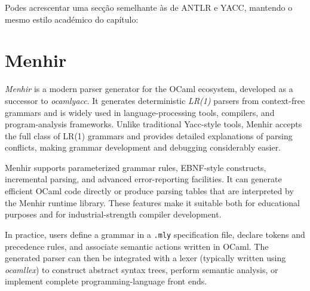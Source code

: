 Podes acrescentar uma secção semelhante às de ANTLR e YACC, mantendo o mesmo estilo académico do capítulo:

\section{Menhir}

\textit{Menhir} is a modern parser generator for the OCaml ecosystem, developed as a successor to \textit{ocamlyacc}. 
It generates deterministic \emph{LR(1)} parsers from context-free grammars and is widely used in language-processing tools,
 compilers, and program-analysis frameworks. Unlike traditional Yacc-style tools, Menhir accepts the full class of LR(1) 
 grammars and provides detailed explanations of parsing conflicts, making grammar development and debugging considerably easier. \cite{menhir}

Menhir supports parameterized grammar rules, EBNF-style constructs, incremental parsing, and advanced error-reporting facilities. 
It can generate efficient OCaml code directly or produce parsing tables that are interpreted by the Menhir runtime library. 
These features make it suitable both for educational purposes and for industrial-strength compiler development. \cite{menhir}

In practice, users define a grammar in a \texttt{.mly} specification file, declare tokens and precedence rules, and associate 
semantic actions written in OCaml. 
The generated parser can then be integrated with a lexer (typically written using \textit{ocamllex}) to construct abstract syntax 
trees, perform semantic analysis, or implement complete programming-language front ends.


